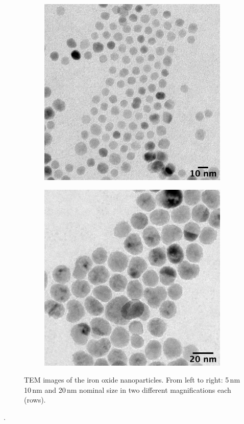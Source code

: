 \begin{figure}[tp]
\begin{subfigure}[b]{0.3\textwidth}
	\end{subfigure}
	\begin{subfigure}[b]{0.3\textwidth}
		\includegraphics[width=\linewidth]{images/temh10.png}
	\end{subfigure}
	\begin{subfigure}[b]{0.3\textwidth}
		\includegraphics[width=\linewidth]{images/temh20.png}
	\end{subfigure}
\caption[TEM images of iron oxide nanoparticle]{TEM images of the iron oxide nanoparticles. From left to right: 5\,nm 10\,nm and 20\,nm nominal size in two different magnifications each (rows).}
\label{fig:tem}
\end{figure}
.


